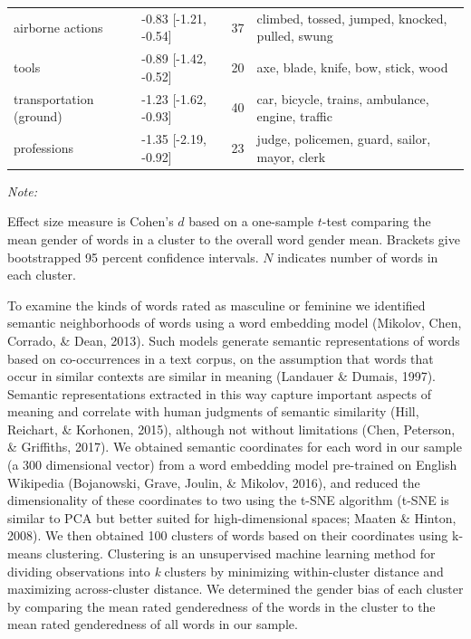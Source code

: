 \documentclass[
  english,
  ,man,floatsintext]{apa6}
\begin{document}
\begin{table}
{\begin{threeparttable}
\begin{tabular}[t]{llrl}
\hspace{1em}airborne actions & -0.83 [-1.21, -0.54] & 37 & climbed, tossed, jumped, knocked, pulled, swung\\
\hspace{1em}tools & -0.89 [-1.42, -0.52] & 20 & axe, blade, knife, bow, stick, wood\\
\hspace{1em}transportation (ground) & -1.23 [-1.62, -0.93] & 40 & car, bicycle, trains, ambulance, engine, traffic\\
\hspace{1em}professions & -1.35 [-2.19, -0.92] & 23 & judge, policemen, guard, sailor, mayor, clerk\\
\bottomrule
\end{tabular}
\begin{tablenotes}[para]
\item \textit{Note:} 
\item Effect size measure is Cohen's $d$ based on a one-sample $t$-test comparing the mean gender of words in a cluster to the overall word gender mean. Brackets give bootstrapped 95 percent confidence intervals. $N$ indicates number of words in each cluster.
\end{tablenotes}
\end{threeparttable}}
\end{table}

To examine the kinds of words rated as masculine or feminine we identified semantic neighborhoods of words using a word embedding model (Mikolov, Chen, Corrado, \& Dean, 2013). Such models generate semantic representations of words based on co-occurrences in a text corpus, on the assumption that words that occur in similar contexts are similar in meaning (Landauer \& Dumais, 1997). Semantic representations extracted in this way capture important aspects of meaning and correlate with human judgments of semantic similarity (Hill, Reichart, \& Korhonen, 2015), although not without limitations (Chen, Peterson, \& Griffiths, 2017). We obtained semantic coordinates for each word in our sample (a 300 dimensional vector) from a word embedding model pre-trained on English Wikipedia (Bojanowski, Grave, Joulin, \& Mikolov, 2016), and reduced the dimensionality of these coordinates to two using the t-SNE algorithm (t-SNE is similar to PCA but better suited for high-dimensional spaces; Maaten \& Hinton, 2008). We then obtained 100 clusters of words based on their coordinates using k-means clustering. Clustering is an unsupervised machine learning method for dividing observations into \emph{k} clusters by minimizing within-cluster distance and maximizing across-cluster distance. We determined the gender bias of each cluster by comparing the mean rated genderedness of the words in the cluster to the mean rated genderedness of all words in our sample.
\end{document}
